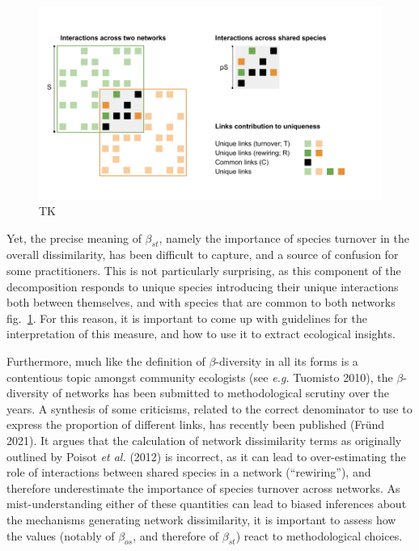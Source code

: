 \documentclass[10pt,oneside]{article}
\makeatletter
\def\maxwidth{\ifdim\Gin@nat@width>\linewidth\linewidth
\else\Gin@nat@width\fi}
\let\Oldincludegraphics\includegraphics
\renewcommand{\includegraphics}[1]{\Oldincludegraphics[width=\maxwidth]{#1}}
\makeatother
\begin{document}
\begin{figure}
\hypertarget{fig:conceptual}{%
\centering
\includegraphics{figures/betadiv_response_figure.png}
\caption{TK}\label{fig:conceptual}
}
\end{figure}

Yet, the precise meaning of \(\beta_{st}\), namely the importance of
species turnover in the overall dissimilarity, has been difficult to
capture, and a source of confusion for some practitioners. This is not
particularly surprising, as this component of the decomposition responds
to unique species introducing their unique interactions both between
themselves, and with species that are common to both networks
fig.~\ref{fig:conceptual}. For this reason, it is important to come up
with guidelines for the interpretation of this measure, and how to use
it to extract ecological insights.

Furthermore, much like the definition of \(\beta\)-diversity in all its
forms is a contentious topic amongst community ecologists (see
\emph{e.g.} Tuomisto 2010), the \(\beta\)-diversity of networks has been
submitted to methodological scrutiny over the years. A synthesis of some
criticisms, related to the correct denominator to use to express the
proportion of different links, has recently been published (Fründ 2021).
It argues that the calculation of network dissimilarity terms as
originally outlined by Poisot \emph{et al.} (2012) is incorrect, as it
can lead to over-estimating the role of interactions between shared
species in a network (``rewiring''), and therefore underestimate the
importance of species turnover across networks. As mist-understanding
either of these quantities can lead to biased inferences about the
mechanisms generating network dissimilarity, it is important to assess
how the values (notably of \(\beta_{os}\), and therefore of
\(\beta_{st}\)) react to methodological choices.
\end{document}
